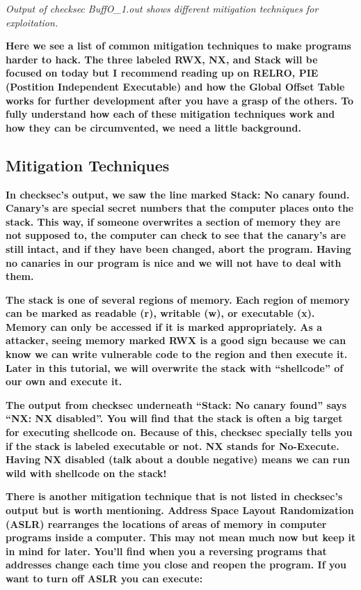 \documentclass[letterpaper]{article}
\begin{document}
\textit{Output of checksec BuffO\_1.out shows different mitigation techniques for exploitation.}

\textbf{Here we see a list of common mitigation techniques to make programs harder to hack. The three labeled RWX, NX,
and Stack will be focused on today but I recommend reading up on RELRO, PIE (Postition Independent Executable) and how
the Global Offset Table works for further development after you have a grasp of the others. To fully understand how
each of these mitigation techniques work and how they can be circumvented, we need a little background.}

\subsection{Mitigation Techniques}

\textbf{In checksec's output, we saw the line marked Stack: No canary found. Canary's are special secret numbers that
the computer places onto the stack. This way, if someone overwrites a section of memory they are not supposed to, the
computer can check to see that the canary's are still intact, and if they have been changed, abort the program. Having
no canaries in our program is nice and we will not have to deal with them.}

\textbf{The stack is one of several regions of memory. Each region of memory can be marked as readable (r), writable
(w), or executable (x). Memory can only be accessed if it is marked appropriately. As a attacker, seeing memory marked
RWX is a good sign because we can know we can write vulnerable code to the region and then execute it. Later in this
tutorial, we will overwrite the stack with ``shellcode'' of our own and execute it.}

\textbf{The output from checksec underneath ``Stack: No canary found'' says ``NX: NX disabled''. You will find that the
stack is often a big target for executing shellcode on. Because of this, checksec specially tells you if the stack is
labeled executable or not. NX stands for No-Execute. Having NX disabled (talk about a double negative) means we can run
wild with shellcode on the stack!}

\textbf{There is another mitigation technique that is not listed in checksec's output but is worth mentioning. Address
Space Layout Randomization (ASLR) rearranges the locations of areas of memory in computer programs inside a computer.
This may not mean much now but keep it in mind for later. You'll find when you a reversing programs that addresses
change each time you close and reopen the program. If you want to turn off ASLR you can execute:}
\end{document}
